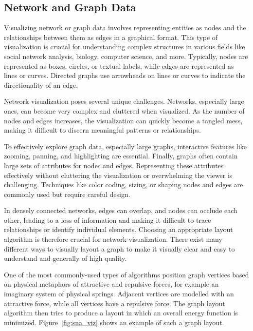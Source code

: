 \subsection*{Network and Graph Data}

Visualizing network or graph data involves representing entities as nodes and the relationships between them as edges in a graphical format. This type of visualization is crucial for understanding complex structures in various fields like social network analysis, biology, computer science, and more. Typically, nodes are represented as boxes, circles, or textual labels, while edges are represented as lines or curves. Directed graphs use arrowheads on lines or curves to indicate the directionality of an edge. 

Network visualization poses several unique challenges. Networks, especially large ones, can become very complex and cluttered when visualized. As the number of nodes and edges increases, the visualization can quickly become a tangled mess, making it difficult to discern meaningful patterns or relationships.

To effectively explore graph data, especially large graphs, interactive features like zooming, panning, and highlighting are essential. Finally, graphs often contain large sets of attributes for nodes and edges. Representing these attributes effectively without cluttering the visualization or overwhelming the viewer is challenging. Techniques like color coding, sizing, or shaping nodes and edges are commonly used but require careful design.

In densely connected networks, edges can overlap, and nodes can occlude each other, leading to a loss of information and making it difficult to trace relationships or identify individual elements. Choosing an appropriate layout algorithm is therefore crucial for network visualization. There exist many different ways to visually layout a graph to make it visually clear and easy to understand and generally of high quality. 

One of the most commonly-used types of algorithms position graph vertices based on physical metaphors of attractive and repulsive forces, for example an imaginary system of physical springs. Adjacent vertices are modelled with an attractive force, while all vertices have a repulsive force. The graph layout algorithm then tries to produce a layout in which an overall energy function is minimized. Figure~\ref{fig:sna_viz} shows an example of such a graph layout.

